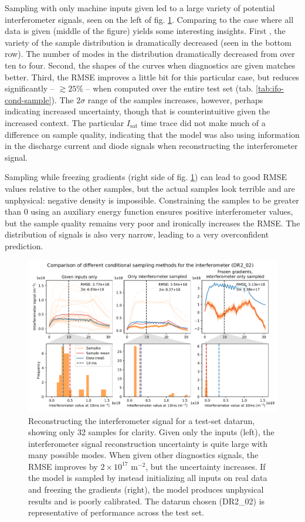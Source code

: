 Sampling with only machine inputs given led to a large variety of potential interferometer signals, seen on the left of fig. \ref{fig:ifo_sample}. Comparing to the case where all data is given (middle of the figure) yields some interesting insights. First , the variety of the sample distribution is dramatically decreased (seen in the bottom row). The number of modes in the distribution dramatically decreased from over ten to four. Second, the shapes of the curves when diagnostics are given matches better. Third, the RMSE improves a little bit for this particular case, but reduces significantly -- $\gtrsim 25$\% -- when computed over the entire test set (tab. \ref{tab:ifo-cond-sample}). The $2 \sigma$ range of the samples increases, however, perhaps indicating increased uncertainty, though that is counterintuitive given the increased context. The particular $I_\text{sat}$ time trace did not make much of a difference on sample quality, indicating that the model was also using information in the discharge current and diode signals when reconstructing the interferometer signal.

Sampling while freezing gradients (right side of fig. \ref{fig:ifo_sample}) can lead to good RMSE values relative to the other samples, but the actual samples look terrible and are unphysical: negative density is impossible. Constraining the samples to be greater than 0 using an auxiliary energy function ensures positive interferometer values, but the sample quality remains very poor and ironically increases the RMSE. The distribution of signals is also very narrow, leading to a very overconfident prediction. 

\begin{figure}
	\centering
	\includegraphics[width=\linewidth]{figures/interferometer_sampling_comp_39-0.pdf}
	\caption[Interferometer time series reconstruction]{\label{fig:ifo_sample}Reconstructing the interferometer signal for a test-set datarun, showing only 32 samples for clarity. Given only the inputs (left), the interferometer signal reconstruction uncertainty is quite large with many possible modes. When given other diagnostics signals, the RMSE improves by $2 \times 10^{17}$ m$^{-2}$, but the uncertainty increases. If the model is sampled by instead initializing all inputs on real data and freezing the gradients (right), the model produces unphysical results and is poorly calibrated. The datarun chosen (DR2\_02) is representative of performance across the test set. }
\end{figure}

